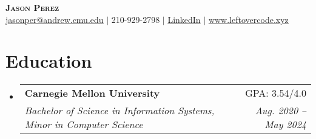 \documentclass[letterpaper,11pt]{article}
\makeatletter
\newcommand{\resumeSubheading}[4]{
  \vspace{-2pt}\item
    \begin{tabular*}{0.97\textwidth}[t]{l@{\extracolsep{\fill}}r}
      \textbf{#1} & #2 \\
      \textit{\small#3} & \textit{\small #4} \\
    \end{tabular*}\vspace{-7pt}
}
\newcommand{\resumeSubHeadingListStart}{\begin{itemize}[leftmargin=0.15in, label={}]}
\newcommand{\resumeSubHeadingListEnd}{\end{itemize}}
\makeatother
\begin{document}

\begin{center}
    \textbf{\Huge \scshape Jason Perez} \\ \vspace{1pt}
    \href{mailto:jperez00100100@gmail.com}{\underline{jasonper@andrew.cmu.edu}} $|$ 
    \small 210-929-2798 $|$
    \href{https://www.linkedin.com/in/jason-perez-a494731b1}{LinkedIn} $|$
    \href{https://www.leftovercode.xyz}{\underline{www.leftovercode.xyz}}
\end{center}


\section{Education}
    \resumeSubHeadingListStart
        \resumeSubheading
        {Carnegie Mellon University}{GPA: 3.54/4.0}
        {Bachelor of Science in Information Systems, Minor in Computer Science}{Aug. 2020 -- May 2024}
    \resumeSubHeadingListEnd


\end{document}
